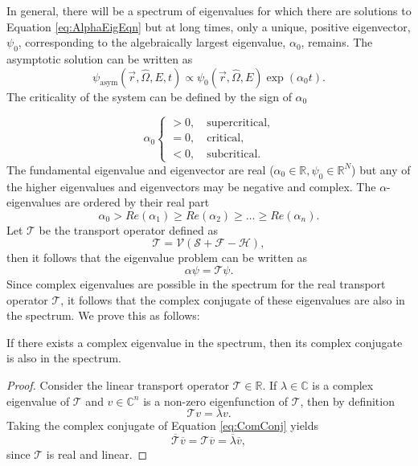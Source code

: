 In general, there will be a spectrum of eigenvalues for which there are solutions to Equation \ref{eq:AlphaEigEqn} but at long times, only a unique, positive eigenvector, $\psi_{0}$,  corresponding to the algebraically largest eigenvalue, $\alpha_{0}$, remains. The asymptotic solution can be written as \cite{nelkin_asymptotic_1963}
\begin{equation}
	\psi_{\text{asym}}(\vec{r},\hat{\Omega},E,t) \propto \psi_{0}(\vec{r},\hat{\Omega},E) \exp(\alpha_{0} t).
\end{equation}
The criticality of the system can be defined by the sign of $\alpha_{0}$

	$$ \alpha_{0} \begin{cases}						  			  			 > 0, \quad \text{supercritical,} \\			 			 			 = 0, \quad \text{critical,} \\
					 < 0, \quad \text{subcritical.} 					                       \end{cases} $$
The fundamental eigenvalue and eigenvector are real ($\alpha_{0} \in \mathbb{R}, \psi_{0} \in \mathbb{R}^{N}$) but any of the higher eigenvalues and eigenvectors may be negative and complex. 
The $\alpha$-eigenvalues are ordered by their real part
\begin{equation}
	\alpha_{0} > Re(\alpha_{1}) \geq Re(\alpha_{2}) \geq \dots \geq Re(\alpha_{n}).
\end{equation}
Let $\mathcal{T}$ be the transport operator defined as
\begin{equation}
	\mathcal{T} = \mathcal{V}(\mathcal{S}+\mathcal{F} - \mathcal{H}),
\end{equation}
then it follows that the eigenvalue problem can be written as
\begin{equation}
	\alpha \psi = \mathcal{T} \psi.
\end{equation}
Since complex eigenvalues are possible in the spectrum for the real transport operator $\mathcal{T}$, it follows that the complex conjugate of these eigenvalues are also in the spectrum. We prove this as follows:
\begin{theorem}
If there exists a complex eigenvalue in the spectrum, then its complex conjugate is also in the spectrum.
\end{theorem}
\begin{proof}
	Consider the linear transport operator $\mathcal{T} \in \mathbb{R}$. If $\lambda \in \mathbb{C}$ is a complex eigenvalue of $\mathcal{T}$ and $v \in \mathbb{C}^{n}$ is a non-zero eigenfunction of $\mathcal{T}$, then by definition
	\begin{equation}
		\mathcal{T} v = \lambda v.
		\label{eq:ComConj}
	\end{equation}
Taking the complex conjugate of Equation \ref{eq:ComConj} yields
\begin{equation}
	\overline{\mathcal{T}}\overline{v} = \mathcal{T} \overline{v} = \overline{\lambda}\overline{v},
	\end{equation}
since $\mathcal{T}$ is real and linear.
\end{proof}
